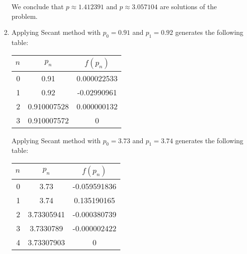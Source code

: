 \documentclass[../../../../Assignments]{subfiles}
\begin{document}
\begin{solution}
\begin{enumerate}[label = \alph*)]
            We conclude that \(p \approx \num{1.412391}\) and \(p \approx
            \num{3.057104}\) are solutions of the problem.

        \item Applying Secant method with \(p_0 = \num{0.91}\) and \(p_1 =
            \num{0.92}\) generates the following table:

            \begin{table}[H]
                \centering
                \begin{tabular}{r S[table-format=1.9] S[table-format=-1.9]}
                    \toprule
                    \(n\)  &   {\(p_n\)}   &  {\(f(p_n)\)}  \\
                      &  0.91         &   0.000022533  \\
                        1  &  0.92         &  -0.02990961   \\
                        2  &  0.910007528  &   0.000000132  \\
                        3  &  0.910007572  &   0            \\
                    \bottomrule
                \end{tabular}
            \end{table}

            Applying Secant method with \(p_0 = \num{3.73}\) and \(p_1 =
            \num{3.74}\) generates the following table:

            \begin{table}[H]
                \centering
                \begin{tabular}{r S[table-format=1.8] S[table-format=-1.9]}
                    \toprule
                    \(n\)  &   {\(p_n\)}   &  {\(f(p_n)\)}  \\
                      &  3.73         &  -0.059591836  \\
                        1  &  3.74         &   0.135190165  \\
                        2  &  3.73305941   &  -0.000380739  \\
                        3  &  3.7330789    &  -0.000002422  \\
                        4  &  3.73307903   &   0            \\
                    \bottomrule
                \end{tabular}
            \end{table}


\end{enumerate}
\end{solution}
\end{document}
